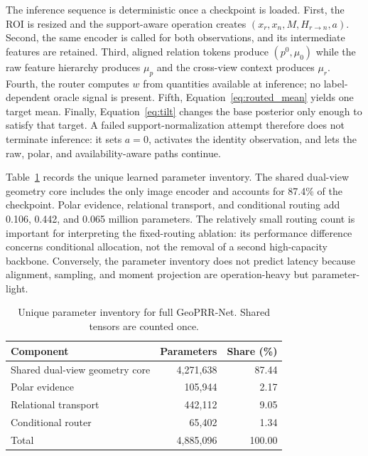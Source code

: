 \documentclass[electronics,article,submit,oneauthor]{Definitions/mdpi}
\newcommand{\modelname}{GeoPRR-Net\xspace}
\begin{document}
The inference sequence is deterministic once a checkpoint is loaded. First, the ROI is resized and the support-aware operation creates $(x_r,x_n,M,H_{r\rightarrow n},a)$. Second, the same encoder is called for both observations, and its intermediate features are retained. Third, aligned relation tokens produce $(p^0,\mu_0)$ while the raw feature hierarchy produces $\mu_p$ and the cross-view context produces $\mu_r$. Fourth, the router computes $w$ from quantities available at inference; no label-dependent oracle signal is present. Fifth, Equation~\eqref{eq:routed_mean} yields one target mean. Finally, Equation~\eqref{eq:tilt} changes the base posterior only enough to satisfy that target. A failed support-normalization attempt therefore does not terminate inference: it sets $a=0$, activates the identity observation, and lets the raw, polar, and availability-aware paths continue.

Table~\ref{tab:parameters} records the unique learned parameter inventory. The shared dual-view geometry core includes the only image encoder and accounts for 87.4\% of the checkpoint. Polar evidence, relational transport, and conditional routing add 0.106, 0.442, and 0.065 million parameters. The relatively small routing count is important for interpreting the fixed-routing ablation: its performance difference concerns conditional allocation, not the removal of a second high-capacity backbone. Conversely, the parameter inventory does not predict latency because alignment, sampling, and moment projection are operation-heavy but parameter-light.

\begin{table}[H]
\caption{Unique parameter inventory for full \modelname. Shared tensors are counted once.}
\label{tab:parameters}
\centering
\small
\begin{tabularx}{0.78\textwidth}{@{}>{\raggedright\arraybackslash}Xrr@{}}
\toprule
\textbf{Component} & \textbf{Parameters} & \textbf{Share (\%)} \\
\midrule
Shared dual-view geometry core & 4,271,638 & 87.44 \\
Polar evidence & 105,944 & 2.17 \\
Relational transport & 442,112 & 9.05 \\
Conditional router & 65,402 & 1.34 \\
\midrule
Total & 4,885,096 & 100.00 \\
\bottomrule
\end{tabularx}
\end{table}
\end{document}
